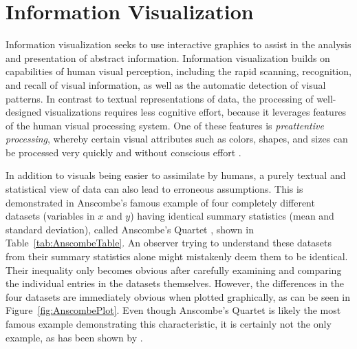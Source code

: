 
\chapter{Information Visualization}
\label{chap:InfoVis}

Information visualization seeks to use interactive graphics to assist
in the analysis and presentation of abstract information. Information
visualization builds on capabilities of human visual perception,
including the rapid scanning, recognition, and recall of visual
information, as well as the automatic detection of visual patterns. In
contrast to textual representations of data, the processing of
well-designed visualizations requires less cognitive effort,
because it leverages features of the human visual processing system.
One of these features is \emph{preattentive processing}, whereby
certain visual attributes such as colors, shapes, and sizes can be
processed very quickly and without conscious effort
\parencite{PreattentiveProcessing}.


In addition to visuals being easier to assimilate by humans, a purely
textual and statistical view of data can also lead to erroneous
assumptions. This is demonstrated in Anscombe's famous example of four
completely different datasets (variables in $x$ and $y$) having
identical summary statistics (mean and standard deviation), called
Anscombe's Quartet \parencite{AnscombesQuartet}, shown in
Table~\ref{tab:AnscombeTable}. An observer trying to understand these
datasets from their summary statistics alone might mistakenly deem
them to be identical. Their inequality only becomes obvious after
carefully examining and comparing the individual entries in the
datasets themselves.
%
However, the differences in the four datasets are immediately obvious
when plotted graphically, as can be seen in
Figure~\ref{fig:AnscombePlot}. Even though Anscombe's Quartet is
likely the most famous example demonstrating this characteristic, it
is certainly not the only example, as has been shown by
\textcite{GenDataIdenticalStatisticsDissimilarGraphics}.




